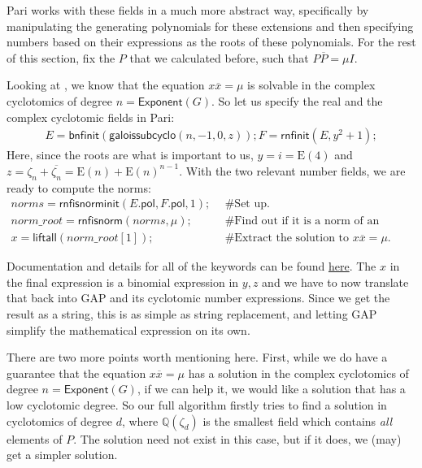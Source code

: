 \documentclass[11pt]{article}
\begin{document}
Pari works with these fields in a much more abstract way, specifically by manipulating
the generating polynomials for these extensions and then specifying numbers based on
their expressions as the roots of these polynomials. For the rest of this section,
fix the $P$ that we calculated before, such that $P\overline{P} = \mu I$.

Looking at \cite[Theorem 1.1]{Pas21}, we know that the equation $x\overline{x}=\mu$
is solvable in the complex cyclotomics of degree $n = \textsf{Exponent}(G)$. So let
us specify the real and the complex cyclotomic fields in Pari:
\begin{align*}
  E = \textsf{bnfinit}(\textsf{galoissubcyclo}(n,-1,0,z));
  F = \textsf{rnfinit}(E, y^2 + 1);
\end{align*}
Here, since the roots are what is important to us, $y = i = \text{E}(4)$ and
$z = \zeta_n + \overline{\zeta_n} = \text{E}(n) + \text{E}(n)^{n-1}$.
With the two relevant number fields, we are ready to compute the norms:
\begin{align*}
  norms = \textsf{rnfisnorminit}(E\textsf{.pol}, F\textsf{.pol}, 1); &~~\text{\# Set up.}\\
  norm\_root = \textsf{rnfisnorm}(norms, \mu); &~~\text{\# Find out if it is a norm of an element.}\\
  x = \textsf{liftall}(norm\_root[1]); &~~\text{\# Extract the solution to } x\overline{x} = \mu.
\end{align*}

Documentation and details for all of the keywords can be found
\href{https://pari.math.u-bordeaux.fr/dochtml/html/General_number_fields.html}{here}.
The $x$ in the final expression is a binomial expression in $y,z$ and we have to now
translate that back into GAP and its cyclotomic number expressions.
Since we get the result as a string, this is as simple as string replacement,
and letting GAP simplify the mathematical expression on its own.

There are two more points worth mentioning here. First, while we do have a guarantee
that the equation $x\overline{x}=\mu$ has a solution in the complex cyclotomics of
degree $n = \textsf{Exponent}(G)$, if we can help it, we would like a solution that
has a low cyclotomic degree. So our full algorithm firstly tries to find a solution
in cyclotomics of degree $d$, where $\mathbb{Q}(\zeta_d)$ is the smallest field
which contains \textit{all} elements of $P$. The solution need not exist in this
case, but if it does, we (may) get a simpler solution.
\end{document}
